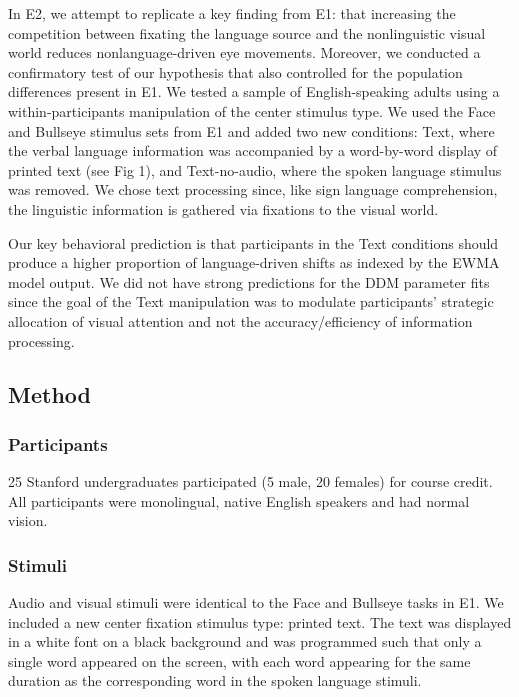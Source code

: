 \documentclass[10pt, letterpaper]{article}
\begin{document}
In E2, we attempt to replicate a key finding from E1: that increasing
the competition between fixating the language source and the
nonlinguistic visual world reduces nonlanguage-driven eye movements.
Moreover, we conducted a confirmatory test of our hypothesis that also
controlled for the population differences present in E1. We tested a
sample of English-speaking adults using a within-participants
manipulation of the center stimulus type. We used the Face and Bullseye
stimulus sets from E1 and added two new conditions: Text, where the
verbal language information was accompanied by a word-by-word display of
printed text (see Fig 1), and Text-no-audio, where the spoken language
stimulus was removed. We chose text processing since, like sign language
comprehension, the linguistic information is gathered via fixations to
the visual world.

Our key behavioral prediction is that participants in the Text
conditions should produce a higher proportion of language-driven shifts
as indexed by the EWMA model output. We did not have strong predictions
for the DDM parameter fits since the goal of the Text manipulation was
to modulate participants' strategic allocation of visual attention and
not the accuracy/efficiency of information processing.

\subsection{Method}\label{method-1}

\subsubsection{Participants}\label{participants-1}

25 Stanford undergraduates participated (5 male, 20 females) for course
credit. All participants were monolingual, native English speakers and
had normal vision.

\subsubsection{Stimuli}\label{stimuli-1}

Audio and visual stimuli were identical to the Face and Bullseye tasks
in E1. We included a new center fixation stimulus type: printed text.
The text was displayed in a white font on a black background and was
programmed such that only a single word appeared on the screen, with
each word appearing for the same duration as the corresponding word in
the spoken language stimuli.
\end{document}
